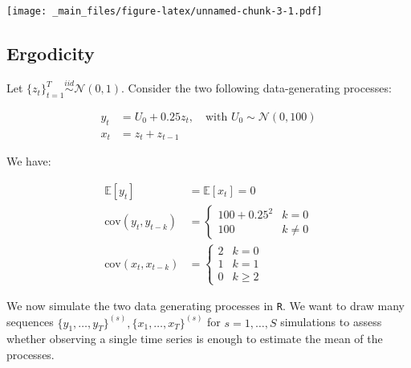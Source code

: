 \documentclass[
]{book}
\begin{document}
\texttt{[image: \_main\_files/figure-latex/unnamed-chunk-3-1.pdf]}

\hypertarget{ergodicity}{%
\subsection*{Ergodicity}\label{ergodicity}}

Let \(\{z_t\}_{t = 1}^{T} \stackrel{iid}{\sim} \mathcal{N}(0, 1)\). Consider the two following data-generating processes:

\[
\begin{aligned}
y_t &= U_0 + 0.25z_t, \quad \text{with  } U_0 \sim \mathcal{N}(0, 100) \\[1ex]
x_t &= z_t + z_{t-1}
\end{aligned}
\]

We have:

\[
\begin{aligned}
\mathbb{E}[y_t] &= \mathbb{E}[x_t] = 0 \\[1em]
\text{cov}(y_t, y_{t-k}) &= 
\begin{cases}
100+0.25^2 & k = 0 \\
100 & k \neq 0
\end{cases} \\[1ex]
\text{cov}(x_t, x_{t-k}) &= 
\begin{cases}
2 & k = 0 \\
1 & k = 1 \\
0 & k \geq 2
\end{cases}
\end{aligned}
\]

We now simulate the two data generating processes in \texttt{R}. We want to draw many sequences \(\{y_1, \dots, y_T\}^{(s)}, \{x_1, \dots, x_T\}^{(s)}\) for \(s = 1, \dots, S\) simulations to assess whether observing a single time series is enough to estimate the mean of the processes.
\end{document}
